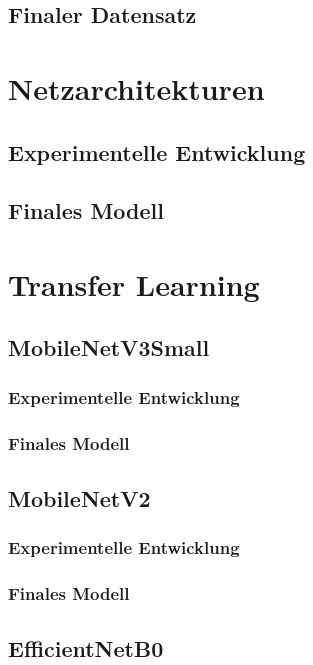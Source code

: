\documentclass[
    a4paper,        %
    11pt,           %
    ngerman,        %
    parskip=half,   %
    listof=totoc,   %
    bibliography=totoc %
]{scrartcl}
\begin{document}
\subsection{Finaler Datensatz}

\section{Netzarchitekturen}

\subsection{Experimentelle Entwicklung}

\subsection{Finales Modell}

\section{Transfer Learning}

\subsection{MobileNetV3Small}

\subsubsection{Experimentelle Entwicklung}

\subsubsection{Finales Modell}

\subsection{MobileNetV2}

\subsubsection{Experimentelle Entwicklung}

\subsubsection{Finales Modell}

\subsection{EfficientNetB0}
\end{document}
